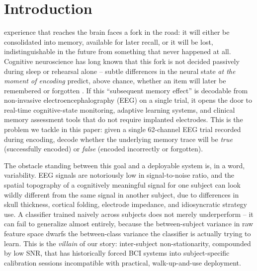 \documentclass[journal]{IEEEtran}
\begin{document}
\section{Introduction}

 experience that reaches the brain faces a fork in the road: it will either be consolidated into memory, available for later recall, or it will be lost, indistinguishable in the future from something that never happened at all. Cognitive neuroscience has long known that this fork is not decided passively during sleep or rehearsal alone -- subtle differences in the neural state \emph{at the moment of encoding} predict, above chance, whether an item will later be remembered or forgotten \cite{paller2002observing,rugg2007event}. If this ``subsequent memory effect'' is decodable from non-invasive electroencephalography (EEG) on a single trial, it opens the door to real-time cognitive-state monitoring, adaptive learning systems, and clinical memory assessment tools that do not require implanted electrodes. This is the problem we tackle in this paper: given a single 62-channel EEG trial recorded during encoding, decode whether the underlying memory trace will be \emph{true} (successfully encoded) or \emph{false} (encoded incorrectly or forgotten).

The obstacle standing between this goal and a deployable system is, in a word, variability. EEG signals are notoriously low in signal-to-noise ratio, and the spatial topography of a cognitively meaningful signal for one subject can look wildly different from the same signal in another subject, due to differences in skull thickness, cortical folding, electrode impedance, and idiosyncratic strategy use. A classifier trained naively across subjects does not merely underperform -- it can fail to generalize almost entirely, because the between-subject variance in raw feature space dwarfs the between-class variance the classifier is actually trying to learn. This is the \emph{villain} of our story: inter-subject non-stationarity, compounded by low SNR, that has historically forced BCI systems into subject-specific calibration sessions incompatible with practical, walk-up-and-use deployment.
\end{document}
